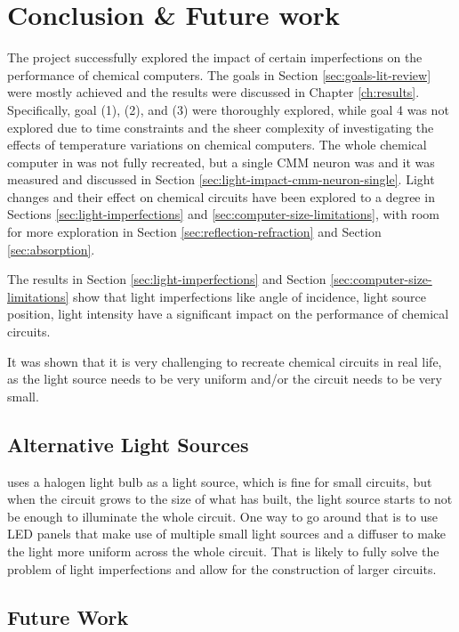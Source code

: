 \chapter{Conclusion \& Future work}
The project successfully explored the impact of certain imperfections on the performance of chemical computers.
The goals in Section \ref{sec:goals-lit-review} were mostly achieved and the results were discussed in Chapter \ref{ch:results}.
Specifically, goal (1), (2), and (3) were thoroughly explored, while goal 4 was not explored due to time constraints and the sheer complexity of
investigating the effects of temperature variations on chemical computers. 
The whole chemical computer in \cite{stovold2017reaction} was not fully recreated, but a single CMM neuron was and it was measured and discussed in Section \ref{sec:light-impact-cmm-neuron-single}.
Light changes and their effect on chemical circuits have been explored to a degree in Sections \ref{sec:light-imperfections} and \ref{sec:computer-size-limitations}, with room 
for more exploration in Section \ref{sec:reflection-refraction} and Section \ref{sec:absorption}.

The results in Section \ref{sec:light-imperfections} and Section \ref{sec:computer-size-limitations} show that light imperfections like 
angle of incidence, light source position, light intensity have a significant impact on the performance of chemical circuits.

It was shown that it is very challenging to recreate chemical circuits in real life, as the light source needs to be very uniform and/or the circuit needs to be very small.

\section{Alternative Light Sources}
\cite{gorecki2003chemical} uses a halogen light bulb as a light source, which is fine for small circuits, but when the circuit grows to the size 
of what \cite{stovold2017reaction} has built, the light source starts to not be enough to illuminate the whole circuit.
One way to go around that is to use LED panels that make use of multiple small light sources and a diffuser to make the light more uniform across the whole circuit.
That is likely to fully solve the problem of light imperfections and allow for the construction of larger circuits.

\section{Future Work}

